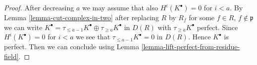 \documentclass[10pt,a4paper]{amsart}
\theoremstyle{plain}
\theoremstyle{definition}
\theoremstyle{remark}
\numberwithin{equation}{subsection}
\begin{document}
\begin{proof}
After decreasing $a$ we may assume that also $H^i(K^\bullet) = 0$ for
$i < a$. By Lemma \ref{lemma-cut-complex-in-two} after replacing $R$ by $R_f$
for some $f \in R$, $f \not \in \mathfrak p$
we can write $K^\bullet = \tau_{\leq a - 1}K^\bullet \oplus
\tau_{\geq a}K^\bullet$ in $D(R)$ with $\tau_{\geq a}K^\bullet$
perfect. Since $H^i(K^\bullet) = 0$ for $i < a$ we see that
$\tau_{\leq a - 1}K^\bullet = 0$ in $D(R)$. Hence $K^\bullet$
is perfect. Then we can conclude using
Lemma \ref{lemma-lift-perfect-from-residue-field}.
\end{proof}
\end{document}
